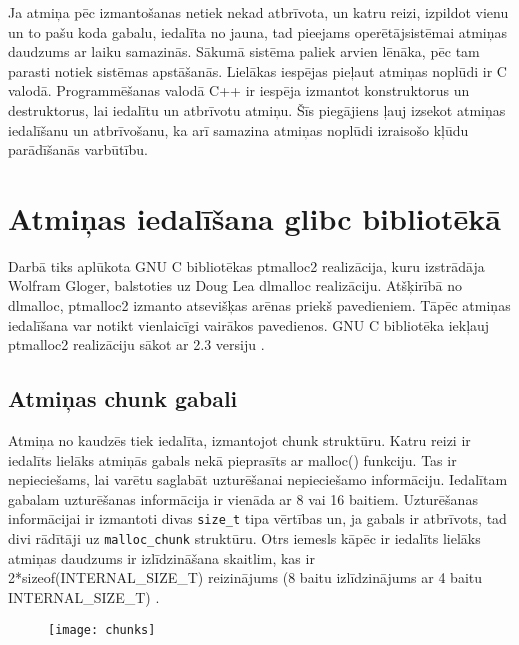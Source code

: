 Ja atmiņa pēc izmantošanas netiek nekad atbrīvota, un katru reizi, izpildot vienu un to pašu koda gabalu, iedalīta no jauna, tad pieejams operētājsistēmai atmiņas daudzums ar laiku samazinās.
Sākumā sistēma paliek arvien lēnāka, pēc tam parasti notiek sistēmas apstāšanās.
Lielākas iespējas pieļaut atmiņas noplūdi ir C valodā. 
Programmēšanas valodā C++ ir iespēja izmantot konstruktorus un destruktorus, lai iedalītu un atbrīvotu atmiņu.
Šīs piegājiens ļauj izsekot atmiņas iedalīšanu un atbrīvošanu, ka arī samazina atmiņas noplūdi izraisošo kļūdu parādīšanās varbūtību.





\section{Atmiņas iedalīšana glibc bibliotēkā}
Darbā tiks aplūkota GNU C bibliotēkas ptmalloc2 realizācija, kuru izstrādāja Wolfram Gloger, balstoties uz Doug Lea dlmalloc realizāciju. 
Atšķirībā no dlmalloc, ptmalloc2 izmanto atsevišķas arēnas priekš pavedieniem.
Tāpēc atmiņas iedalīšana var notikt vienlaicīgi vairākos pavedienos.
GNU C bibliotēka iekļauj ptmalloc2 realizāciju sākot ar 2.3 versiju \cite {MWIKI}. 

\subsection{Atmiņas chunk gabali}
Atmiņa no kaudzēs tiek iedalīta, izmantojot chunk struktūru.
Katru reizi ir iedalīts lielāks atmiņās gabals nekā pieprasīts ar malloc() funkciju.
Tas ir nepieciešams, lai varētu saglabāt uzturēšanai nepieciešamo informāciju. Iedalītam gabalam uzturēšanas informācija ir vienāda ar 8 vai 16 baitiem.
Uzturēšanas informācijai ir izmantoti divas \texttt{size\_t} tipa vērtības un, ja gabals ir atbrīvots, tad divi rādītāji uz \texttt{malloc\_chunk} struktūru. 
Otrs iemesls kāpēc ir iedalīts lielāks atmiņas daudzums ir izlīdzināšana skaitlim, kas ir 2*sizeof(INTERNAL\_SIZE\_T) reizinājums (8 baitu izlīdzinājums ar 4 baitu INTERNAL\_SIZE\_T) \cite {MALLOC}.  


\begin{figure}[h]
\begin{center}
\texttt{[image: chunks]}
\end{center}
\caption{\textbf{\fontsize{11}{12}\selectfont {Atmiņas gabalu struktūra}}}
\label{fig:chunks}
\end{figure}


